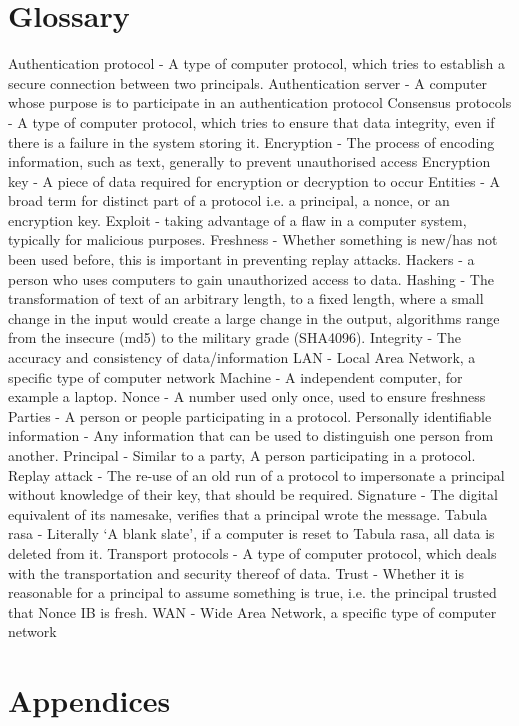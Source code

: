 \documentclass{article}
\begin{document}
\section{Glossary}
Authentication protocol - A type of computer protocol, which tries to establish a secure connection between two principals.
Authentication server - A computer whose purpose is to participate in an authentication protocol
Consensus protocols - A type of computer protocol, which tries to ensure that data integrity, even if there is a failure in the system storing it.
Encryption - The process of encoding information, such as text, generally to prevent unauthorised access
Encryption key - A piece of data required for encryption or decryption to occur
Entities - A broad term for distinct part of a protocol i.e. a principal, a nonce, or an encryption key.
Exploit - taking advantage of a flaw in a computer system, typically for malicious purposes.
Freshness - Whether something is new/has not been used before, this is important in preventing replay attacks.
Hackers - a person who uses computers to gain unauthorized access to data.
Hashing - The transformation of text of an arbitrary length, to a fixed length, where a small change in the input would create a large change in the output, algorithms range from the insecure (md5) to the military grade (SHA4096).
Integrity - The accuracy and consistency of data/information
LAN - Local Area Network, a specific type of computer network
Machine - A independent computer, for example a laptop.
Nonce - A number used only once, used to ensure freshness
Parties - A person or people participating in a protocol.
Personally identifiable information - Any information that can be used to distinguish one person from another.
Principal - Similar to a party, A person participating in a protocol.
Replay attack - The re-use of an old run of a protocol to impersonate a principal without knowledge of their key, that should be required.
Signature - The digital equivalent of its namesake, verifies that a principal wrote the message.
Tabula rasa - Literally ‘A blank slate’, if a computer is reset to Tabula rasa, all data is deleted from it.
Transport protocols - A type of computer protocol, which deals with the transportation and security thereof of data.
Trust - Whether it is reasonable for a principal to assume something is true, i.e. the principal trusted that Nonce IB is fresh.
WAN - Wide Area Network, a specific type of computer network


\newpage
\section{Appendices}
\end{document}
